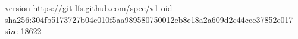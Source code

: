 version https://git-lfs.github.com/spec/v1
oid sha256:304fb5173727b04c010f5aa989580750012eb8e18a2a609d2c44cce37852e017
size 18622
